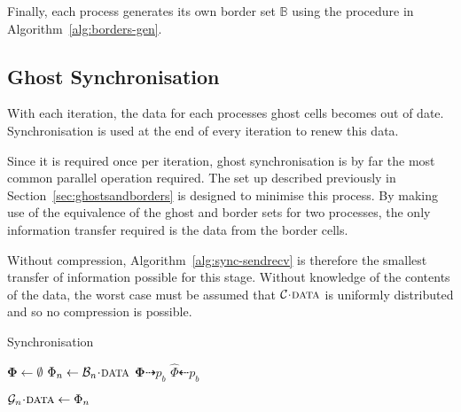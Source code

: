 \documentclass[twoside]{IIBproject}
\newcommand{\vect} [1] {\bm{#1}}
\newcommand{\dra}{\dashrightarrow}
\newcommand{\dla}{\dashleftarrow}
\newcommand{\acc}{{\mkern 0.5mu\cdot\mkern 0.5mu}}
\numberwithin{figure}{section}
\begin{document}
        Finally, each process generates its own border set $\mathbb{B}$ using the procedure in Algorithm~\ref{alg:borders-gen}.



    \subsection{Ghost Synchronisation} %
        \label{sec:ghostsync}

        With each iteration, the data for each processes ghost cells becomes out of date. Synchronisation is used at the end of every iteration to renew this data.

        Since it is required once per iteration, ghost synchronisation is by far the most common parallel operation required. The set up described previously in Section~\ref{sec:ghostsandborders} is designed to minimise this process. By making use of the equivalence of the ghost and border sets for two processes, the only information transfer required is the data from the border cells.

        Without compression, Algorithm~\ref{alg:sync-sendrecv} is therefore the smallest transfer of information possible for this stage. Without knowledge of the contents of the data, the worst case must be assumed that $\mathcal{C}\acc\textproc{data}$ is uniformly distributed and so no compression is possible. 

        \begin{algorithm}[!htbp]
            \caption{Synchronisation}
            \label{alg:sync-sendrecv}

            \begin{algorithmic}
                    \State $\vect{\Phi} \gets \emptyset$
                        \State $\Phi_n \gets \mathcal{B}_n\acc\textproc{data}$
                    \EndFor
                    \Send $\vect{\Phi} \dra p_b$
                \EndFor
                \Statex
                    \Recv $\hat \Phi \dla p_b$

                        \State $\mathcal{G}_n\acc\textproc{data} \gets \Phi_n$
                    \EndFor
                \EndFor
            \end{algorithmic}
        \end{algorithm}
\end{document}
